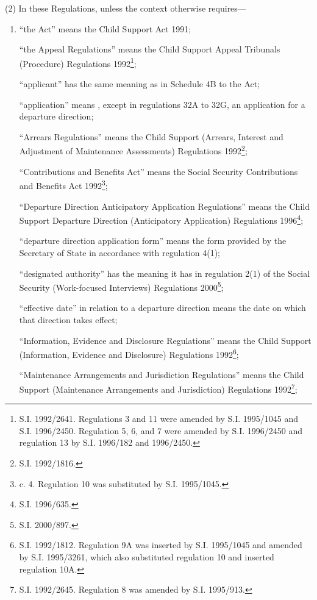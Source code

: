 \documentclass[12pt,a4paper]{article}
\begin{document}
(2) In these Regulations, unless the context otherwise requires—
\begin{enumerate}\item[]
“the Act” means the Child Support Act 1991;

“the Appeal Regulations” means the Child Support Appeal Tribunals (Procedure)
Regulations 1992\footnote{\frenchspacing S.I. 1992/2641. Regulations 3 and 11 were amended by S.I. 1995/1045 and S.I. 1996/2450. Regulation 5, 6, and 7 were amended by S.I. 1996/2450 and regulation 13 by S.I. 1996/182 and 1996/2450.};

“applicant” has the same meaning as in Schedule 4B to the Act;

“application” means%
, except in regulations 32A to 32G,  %
an application for a departure direction;

“Arrears Regulations” means the Child Support (Arrears, Interest and Adjustment
of Maintenance Assessments) Regulations 1992\footnote{\frenchspacing S.I. 1992/1816.};

“Contributions and Benefits Act” means the Social Security Contributions and
Benefits Act 1992\footnote{ c. 4. Regulation 10 was substituted by S.I. 1995/1045.};

“Departure Direction Anticipatory Application Regulations” means the Child
Support Departure Direction (Anticipatory Application) Regulations 1996\footnote{\frenchspacing S.I. 1996/635.};

“departure direction application form” means the form provided by the Secretary
of State in accordance with regulation 4(1);

“designated authority” has the meaning it has in regulation 2(1) of the Social Security (Work-focused Interviews) Regulations 2000\footnote{\frenchspacing S.I. 2000/897.};

“effective date” in relation to a departure direction means the date on which
that direction takes effect;

“Information, Evidence and Disclosure Regulations” means the Child Support
(Information, Evidence and Disclosure) Regulations 1992\footnote{\frenchspacing S.I. 1992/1812. Regulation 9A was inserted by S.I. 1995/1045 and amended by S.I. 1995/3261, which also substituted regulation 10 and inserted regulation 10A.};

“Maintenance Arrangements and Jurisdiction Regulations” means the Child Support
(Maintenance Arrangements and Jurisdiction) Regulations 1992\footnote{\frenchspacing S.I. 1992/2645. Regulation 8 was amended by S.I. 1995/913.};


\end{enumerate}
\end{document}
